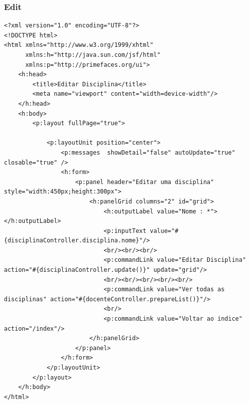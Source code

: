 \documentclass[12pt,a4paper]{article}
\begin{document}
\subsubsection{Edit}
\label{subsubsectionDisciplinaEdit}
\begin{lstlisting}
<?xml version="1.0" encoding="UTF-8"?>
<!DOCTYPE html>
<html xmlns="http://www.w3.org/1999/xhtml"
      xmlns:h="http://java.sun.com/jsf/html"
      xmlns:p="http://primefaces.org/ui">
    <h:head>
        <title>Editar Disciplina</title>
        <meta name="viewport" content="width=device-width"/>
    </h:head>
    <h:body>
        <p:layout fullPage="true">

            <p:layoutUnit position="center">
                <p:messages  showDetail="false" autoUpdate="true" closable="true" />
                <h:form>
                    <p:panel header="Editar uma disciplina" style="width:450px;height:300px">  
                        <h:panelGrid columns="2" id="grid"> 
                            <h:outputLabel value="Nome : *"></h:outputLabel>  
                            <p:inputText value="#{disciplinaController.disciplina.nome}"/>    
                            <br/><br/><br/>
                            <p:commandLink value="Editar Disciplina" action="#{disciplinaController.update()}" update="grid"/> 
                            <br/><br/><br/><br/><br/>
                            <p:commandLink value="Ver todas as disciplinas" action="#{docenteController.prepareList()}"/>
                            <br/>
                            <p:commandLink value="Voltar ao indice" action="/index"/>
                        </h:panelGrid>  
                    </p:panel>
                </h:form>
            </p:layoutUnit>
        </p:layout>
    </h:body>
</html>
\end{lstlisting}
\end{document}
